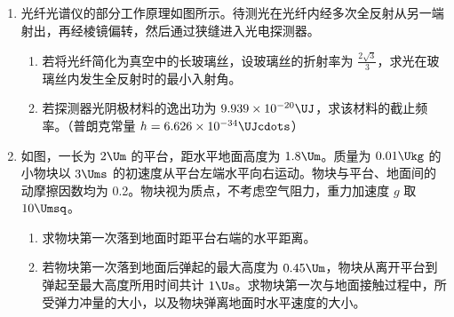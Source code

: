\documentclass[\gkver]{gaokaozhenti}
\begin{document}
\begin{enumerate}
{②由于实验中使用同一把刻度尺进行测量，分度值相同，根据数据分析，桶内水位高度 $H$ 明显大于集气室内进水高度 $h$，所以测量桶内水位高度 $H$ 产生的相对误差较小；

③该延长线不过原点的主要原因是与集气室相连的细管中的气体被忽略不计，导致集气室气体体积 $V$ 相比于实际气体体积偏小。

（2）桶内水位高度 $H$ 越大，集气室内气体压强越大，铁芯进入电感线圈的长度越大，电感线圈的自感系数越大，根据 $T = 2\pi\sqrt{LC}$ 可知 LC 振荡电路的周期越大，所以题图中乙对应的水位较高。
}

\item
光纤光谱仪的部分工作原理如图所示。待测光在光纤内经多次全反射从另一端射出，再经棱镜偏转，然后通过狭缝进入光电探测器。
\begin{enumerate}
\item
若将光纤简化为真空中的长玻璃丝，设玻璃丝的折射率为 $\frac{2\sqrt{3}}{3}$，求光在玻璃丝内发生全反射时的最小入射角。
\item
若探测器光阴极材料的逸出功为 $9.939\times10^{-20}\UJ$，求该材料的截止频率。（普朗克常量 $h = 6.626\times10^{-34}\UJcdots$）
\end{enumerate}



\item
如图，一长为 $2\Um$ 的平台，距水平地面高度为 $1.8\Um$。质量为 $0.01\Ukg$ 的小物块以 $3\Ums$ 的初速度从平台左端水平向右运动。物块与平台、地面间的动摩擦因数均为 0.2。物块视为质点，不考虑空气阻力，重力加速度 $g$ 取 $10\Umsq$。
\begin{enumerate}
\item
求物块第一次落到地面时距平台右端的水平距离。
\item
若物块第一次落到地面后弹起的最大高度为 $0.45\Um$，物块从离开平台到弹起至最大高度所用时间共计 $1\Us$。求物块第一次与地面接触过程中，所受弹力冲量的大小，以及物块弹离地面时水平速度的大小。
\end{enumerate}


\end{enumerate}
\end{document}
